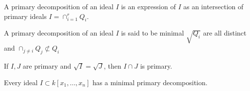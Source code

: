 \documentclass[crop=false,class=article,oneside]{standalone}
\begin{document}
            \begin{definition}
                A primary decomposition of an ideal $I$ is
                an expression of $I$ as an intersection of
                primary ideals $I=\cap_{i=1}^{r} Q_{i}$.
            \end{definition}
            \begin{definition}
                A primary decomposition of an ideal $I$
                is said to be minimal $\sqrt{Q_i}$ are all
                distinct and
                $\cap_{j\ne i}Q_j\not\subset Q_i$
            \end{definition}
            \begin{theorem}
                If $I,J$ are primary and
                $\sqrt{I}=\sqrt{J}$,
                then $I\cap J$ is primary.
            \end{theorem}
            \begin{theorem}
                Every ideal $I \subset k[x_1,\hdots ,x_n]$
                has a minimal primary decomposition.
            \end{theorem}
\end{document}
